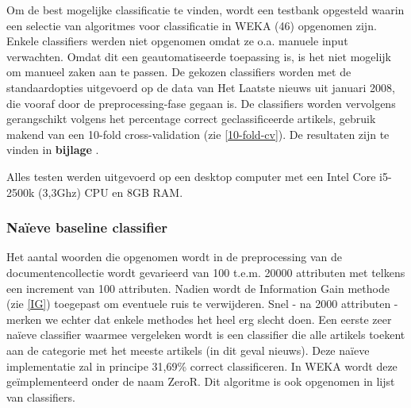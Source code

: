 Om de best mogelijke classificatie te vinden, wordt een testbank opgesteld waarin een selectie van algoritmes voor classificatie in WEKA (46) opgenomen zijn. Enkele classifiers werden niet opgenomen omdat ze o.a. manuele input verwachten. Omdat dit een geautomatiseerde toepassing is, is het niet mogelijk om manueel zaken aan te passen. De gekozen classifiers worden met de standaardopties uitgevoerd op de data van Het Laatste nieuws uit januari 2008, die vooraf door de preprocessing-fase gegaan is. De classifiers worden vervolgens gerangschikt volgens het percentage correct geclassificeerde artikels, gebruik makend van een 10-fold cross-validation (zie \ref{10-fold-cv}). De resultaten zijn te vinden in \textbf{bijlage %
}.

Alles testen werden uitgevoerd op een desktop computer met een Intel Core i5-2500k (3,3Ghz) CPU en 8GB RAM. 

\subsubsection{Na\"ieve baseline classifier}\label{naieve-classifier}
Het aantal woorden die opgenomen wordt in de preprocessing van de documentencollectie wordt gevarieerd van 100 t.e.m. 20000 attributen met telkens een increment van 100 attributen. Nadien wordt de Information Gain methode (zie \ref{IG}) toegepast om eventuele ruis te verwijderen. Snel - na 2000 attributen - merken we echter dat enkele methodes het heel erg slecht doen. Een eerste zeer na\"ieve classifier waarmee vergeleken wordt is een classifier die alle artikels toekent aan de categorie met het meeste artikels (in dit geval nieuws). Deze na\"ieve implementatie zal in principe 31,69\% correct classificeren. In WEKA wordt deze ge\"implementeerd onder de naam ZeroR. Dit algoritme is ook opgenomen in lijst van classifiers. 

